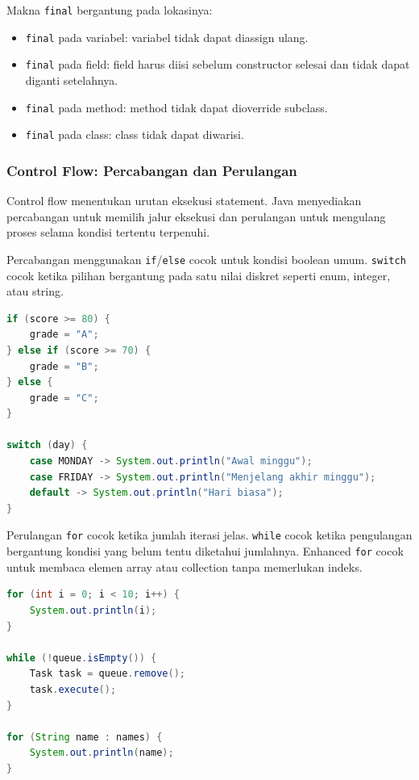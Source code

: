 Makna \texttt{final} bergantung pada lokasinya:

\begin{itemize}
    \item \texttt{final} pada variabel: variabel tidak dapat diassign ulang.
    \item \texttt{final} pada field: field harus diisi sebelum constructor selesai dan tidak dapat diganti setelahnya.
    \item \texttt{final} pada method: method tidak dapat dioverride subclass.
    \item \texttt{final} pada class: class tidak dapat diwarisi.
\end{itemize}

\subsubsection{Control Flow: Percabangan dan Perulangan}

\begin{jawab}
Control flow menentukan urutan eksekusi statement. Java menyediakan percabangan untuk memilih jalur eksekusi dan perulangan untuk mengulang proses selama kondisi tertentu terpenuhi.
\end{jawab}

Percabangan menggunakan \texttt{if}/\texttt{else} cocok untuk kondisi boolean umum. \texttt{switch} cocok ketika pilihan bergantung pada satu nilai diskret seperti enum, integer, atau string.

\begin{lstlisting}[language=Java, caption={Percabangan if dan switch}, label={lst:control-if-switch}]
if (score >= 80) {
    grade = "A";
} else if (score >= 70) {
    grade = "B";
} else {
    grade = "C";
}

switch (day) {
    case MONDAY -> System.out.println("Awal minggu");
    case FRIDAY -> System.out.println("Menjelang akhir minggu");
    default -> System.out.println("Hari biasa");
}
\end{lstlisting}

Perulangan \texttt{for} cocok ketika jumlah iterasi jelas. \texttt{while} cocok ketika pengulangan bergantung kondisi yang belum tentu diketahui jumlahnya. Enhanced \texttt{for} cocok untuk membaca elemen array atau collection tanpa memerlukan indeks.

\begin{lstlisting}[language=Java, caption={Perulangan dasar Java}, label={lst:loops-java}]
for (int i = 0; i < 10; i++) {
    System.out.println(i);
}

while (!queue.isEmpty()) {
    Task task = queue.remove();
    task.execute();
}

for (String name : names) {
    System.out.println(name);
}
\end{lstlisting}

